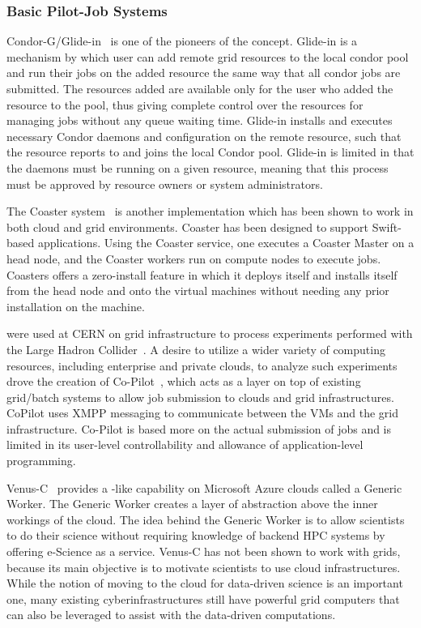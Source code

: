 \documentclass{sig-alternate}
\begin{document}
\subsubsection{Basic Pilot-Job Systems}
Condor-G/Glide-in~\cite{condor-g} is one of the pioneers of the \pilotjob
concept. Glide-in is a mechanism by which user can add remote grid resources
to the local condor pool and run their jobs on the added resource the same way
that all condor jobs are submitted. The resources added are available only for
the user who added the resource to the pool, thus giving complete control over
the resources for managing jobs without any queue waiting time. Glide-in
installs and executes necessary Condor daemons and configuration on the remote
resource, such that the resource reports to and joins the local Condor pool.
Glide-in is limited in that the daemons must be running on a given resource,
meaning that this process must be approved by resource owners or system
administrators.

The Coaster system~\cite{coasters} is another \pilotjob implementation
which has been shown to work in both cloud and grid
environments. Coaster has been designed to support Swift-based applications. 
Using the Coaster service, one executes a Coaster Master
on a head node, and the Coaster workers run on compute nodes to
execute jobs. Coasters offers a zero-install feature in which it
deploys itself and installs itself from the head node and onto the
virtual machines without needing any prior installation on the
machine. 

\pilotjobs were used at CERN on grid infrastructure to process experiments 
performed with the Large Hadron Collider~\cite{copilot-tr}. 
A desire to utilize a wider variety of computing resources, including 
enterprise and private clouds, to analyze such experiments drove the creation 
of Co-Pilot~\cite{copilot-tr}, which acts as a layer on top of existing
grid/batch systems to allow job submission to clouds and grid infrastructures. 
CoPilot uses XMPP messaging to communicate between the VMs and the grid 
infrastructure. Co-Pilot is based more on the actual
submission of jobs and is limited in its user-level controllability and 
allowance of application-level programming.

Venus-C~\cite{venusc-generic-worker} provides a \pilotjob-like
capability on Microsoft Azure clouds called a Generic Worker. The
Generic Worker creates a layer of abstraction above the inner workings
of the cloud.  The idea behind the Generic Worker is to allow
scientists to do their science without requiring knowledge of backend
HPC systems by offering e-Science as a service. Venus-C has not been
shown to work with grids, because its main objective is to motivate
scientists to use cloud infrastructures.  While the notion of moving
to the cloud for data-driven science is an important one, many
existing cyberinfrastructures still have powerful grid computers that
can also be leveraged to assist with the data-driven computations.
\end{document}
